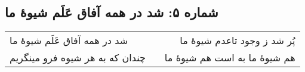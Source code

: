 \begin{center}
\section*{شماره ۵: شد در همه آفاق عَلَم شیوۀ ما}
\label{sec:005}
\begin{longtable}{l p{0.5cm} r}
شد در همه آفاق عَلَم شیوهٔ ما
&&
پُر شد ز وجود تاعدم شیوهٔ ما
\\
چندان که به هر شیوه فرو مینگریم
&&
هم شیوهٔ ما به است هم شیوهٔ ما
\\
\end{longtable}
\end{center}
